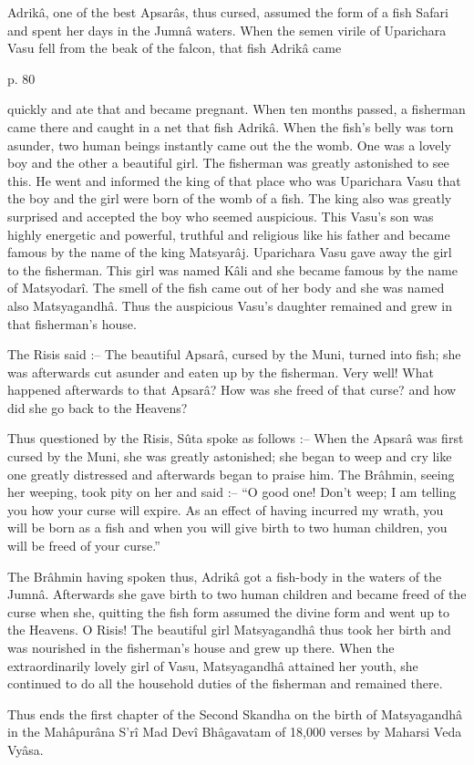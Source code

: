  

Adrikâ, one of the best Apsarâs, thus cursed, assumed the form of a fish Safari and spent her days in the Jumnâ waters. When the semen virile of Uparichara Vasu fell from the beak of the falcon, that fish Adrikâ came

 

p. 80

 

quickly and ate that and became pregnant. When ten months passed, a fisherman came there and caught in a net that fish Adrikâ. When the fish's belly was torn asunder, two human beings instantly came out the the womb. One was a lovely boy and the other a beautiful girl. The fisherman was greatly astonished to see this. He went and informed the king of that place who was Uparichara Vasu that the boy and the girl were born of the womb of a fish. The king also was greatly surprised and accepted the boy who seemed auspicious. This Vasu's son was highly energetic and powerful, truthful and religious like his father and became famous by the name of the king Matsyarâj. Uparichara Vasu gave away the girl to the fisherman. This girl was named Kâli and she became famous by the name of Matsyodarî. The smell of the fish came out of her body and she was named also Matsyagandhâ. Thus the auspicious Vasu's daughter remained and grew in that fisherman's house.

 

The Risis said :-- The beautiful Apsarâ, cursed by the Muni, turned into fish; she was afterwards cut asunder and eaten up by the fisherman. Very well! What happened afterwards to that Apsarâ? How was she freed of that curse? and how did she go back to the Heavens?

 

Thus questioned by the Risis, Sûta spoke as follows :-- When the Apsarâ was first cursed by the Muni, she was greatly astonished; she began to weep and cry like one greatly distressed and afterwards began to praise him. The Brâhmin, seeing her weeping, took pity on her and said :-- “O good one! Don't weep; I am telling you how your curse will expire. As an effect of having incurred my wrath, you will be born as a fish and when you will give birth to two human children, you will be freed of your curse.”

 

The Brâhmin having spoken thus, Adrikâ got a fish-body in the waters of the Jumnâ. Afterwards she gave birth to two human children and became freed of the curse when she, quitting the fish form assumed the divine form and went up to the Heavens. O Risis! The beautiful girl Matsyagandhâ thus took her birth and was nourished in the fisherman's house and grew up there. When the extraordinarily lovely girl of Vasu, Matsyagandhâ attained her youth, she continued to do all the household duties of the fisherman and remained there.

 

Thus ends the first chapter of the Second Skandha on the birth of Matsyagandhâ in the Mahâpurâna S’rî Mad Devî Bhâgavatam of 18,000 verses by Maharsi Veda Vyâsa.